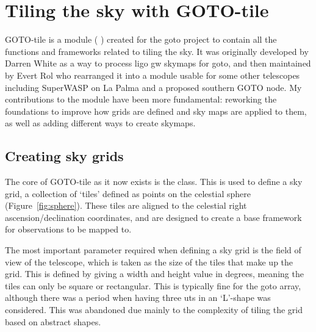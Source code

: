 
\newpage
\section{Tiling the sky with GOTO-tile}
\label{sec:gototile}
\begin{colsection}


\begin{colsection}

GOTO-tile is a  module ( ) created for the \gls{goto} project to contain all the functions and frameworks related to tiling the sky. It was originally developed by Darren White as a way to process \gls{ligo} \gls{gw} skymaps for \gls{goto}, and then maintained by Evert Rol who rearranged it into a module usable for some other telescopes including SuperWASP on La Palma and a proposed southern GOTO node. My contributions to the module have been more fundamental: reworking the foundations to improve how grids are defined and sky maps are applied to them, as well as adding different ways to create skymaps.

\end{colsection}


\subsection{Creating sky grids}
\label{sec:grids}
\begin{colsection}

The core of GOTO-tile as it now exists is the  class. This is used to define a sky grid, a collection of `tiles' defined as points on the celestial sphere (Figure~\ref{fig:sphere}). These tiles are aligned to the celestial right ascension/declination coordinates, and are designed to create a base framework for observations to be mapped to.

The most important parameter required when defining a sky grid is the field of view of the telescope, which is taken as the size of the tiles that make up the grid. This is defined by giving a width and height value in degrees, meaning the tiles can only be square or rectangular. This is typically fine for the \gls{goto} array, although there was a period when having three \glspl{ut} in an `L'-shape was considered. This was abandoned due mainly to the complexity of tiling the grid based on abstract shapes.


\end{colsection}
\end{colsection}

